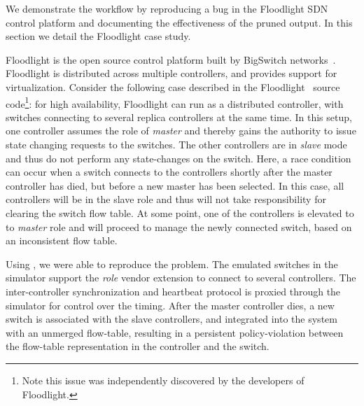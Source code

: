 We demonstrate the \simulator{} workflow by reproducing a bug in the Floodlight
SDN control platform and documenting the effectiveness of the pruned output.
In this section we detail the Floodlight case study.

Floodlight is the open source control platform built by BigSwitch
networks~\cite{bigswitch}. Floodlight is distributed across multiple
controllers, and provides support for virtualization.
Consider the following case described in the
Floodlight~\cite{floodlight} source code\footnote{Note this issue was
independently discovered by the developers of Floodlight.}: for high availability, Floodlight can run as a
distributed controller, with switches connecting to several replica controllers at the
same time. In this setup, one controller assumes the role of \emph{master} and
thereby gains the authority to issue state changing requests to the switches.
The other controllers are in \emph{slave} mode and thus do not perform any
state-changes on the switch. Here, a race condition can occur when a switch
connects to the controllers shortly after the master controller has died, but
before a new master has been selected. In this case, all controllers will be in
the slave role and thus will not take responsibility for clearing the switch
flow table. At some point, one of the controllers is elevated to to
\emph{master} role and will proceed to manage the newly connected switch, based
on an inconsistent flow table.

Using \projectname, we were able to reproduce the problem. The
emulated switches in the simulator support the \emph{role} vendor extension to
connect to several controllers. The inter-controller synchronization and heartbeat
protocol is proxied through the simulator for control over the timing. After the
master controller dies, a new switch is associated with the slave controllers, and
integrated into the system with an unmerged flow-table, resulting in a persistent
policy-violation between the flow-table representation in the controller and the switch.

